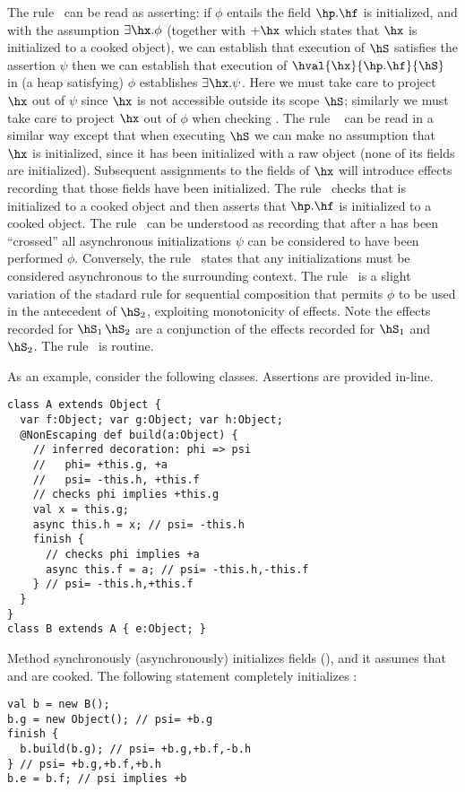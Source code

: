 The rule~ can be read as asserting: if $\phi$ entails
the field $\hp.\hf$ is initialized, and with the assumption $\exists \hx.\phi$
(together with $+\hx$ which states that $\hx$ is initialized to a
cooked object), we can establish that execution of $\hS$ satisfies the assertion
$\psi$ then we can establish that execution of
$\hval{\hx}{\hp.\hf}{\hS}$ in
(a heap satisfying) $\phi$ establishes $\exists \hx.\psi$. Here we
must take care to project $\hx$ out of $\psi$ since $\hx$ is not
accessible outside its scope $\hS$; similarly we must take care to
project $\hx$ out of $\phi$ when checking \hS.
The rule ~ can be read in a similar way except that when
executing $\hS$ we can make no assumption that $\hx$ is initialized,
since it has been initialized with a raw object (none of its fields
are initialized). Subsequent assignments to the fields of $\hx$ will
introduce effects recording that those fields have been initialized.
The rule~ checks that \hq{} is initialized to a
cooked object and then asserts that $\hp.\hf$ is initialized to a
cooked object.
The rule~ can be understood as recording that after a
\finish{} has been ``crossed'' all asynchronous initializations $\psi$
can be considered to have been performed $\phi$. Conversely,
the rule~ states that any initializations must be
considered asynchronous to the surrounding context.
The rule~ is a slight variation of the stadard rule for
sequential composition that permits $\phi$ to be used in the
antecedent of $\hS_2$, exploiting monotonicity of effects. Note the
effects recorded for $\hS_1\,\hS_2$ are a conjunction of the effects
recorded for $\hS_1$ and $\hS_2$.
The rule~ is routine.

As an example, consider the following classes. Assertions are provided
in-line.
\vspace{-0.2cm}\begin{lstlisting}
class A extends Object {
  var f:Object; var g:Object; var h:Object;
  @NonEscaping def build(a:Object) {
    // inferred decoration: phi => psi
    //   phi= +this.g, +a
    //   psi= -this.h, +this.f
    // checks phi implies +this.g
    val x = this.g;
    async this.h = x; // psi= -this.h
    finish {
      // checks phi implies +a
      async this.f = a; // psi= -this.h,-this.f
    } // psi= -this.h,+this.f
  }
}
class B extends A { e:Object; }
\end{lstlisting}\vspace{-0.2cm}
Method  synchronously (asynchronously) initializes fields  (),
    and it assumes that  and  are cooked.
The following statement completely initializes :
\vspace{-0.2cm}\begin{lstlisting}
val b = new B();
b.g = new Object(); // psi= +b.g
finish {
  b.build(b.g); // psi= +b.g,+b.f,-b.h
} // psi= +b.g,+b.f,+b.h
b.e = b.f; // psi implies +b
\end{lstlisting}\vspace{-0.2cm}


